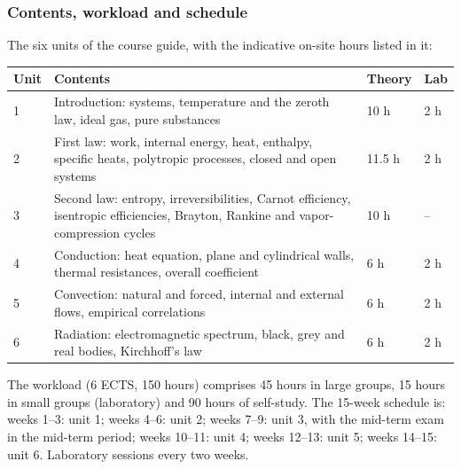 \documentclass[11pt]{article}
\newcommand{\NEW}[1]{\iffinal #1\else{\color{red}#1}\fi}
\begin{document}
\subsubsection{Contents, workload and schedule}
The six units of the course guide, with \NEW{the indicative} on-site hours \NEW{listed in it}:
\begin{center}\small
\begin{tabularx}{\textwidth}{@{}p{0.6cm}Xp{1.3cm}p{1.2cm}@{}}
\toprule
\textbf{Unit} & \textbf{Contents} & \textbf{Theory} & \textbf{Lab} \\
\midrule
1 & Introduction: systems, temperature and the zeroth law, ideal gas, pure substances & 10 h & 2 h \\
2 & First law: work, internal energy, heat, enthalpy, specific heats, polytropic processes, closed and open systems & 11.5 h & 2 h \\
3 & Second law: entropy, irreversibilities, Carnot efficiency, isentropic efficiencies, Brayton, Rankine and vapor-compression cycles & 10 h & -- \\
4 & Conduction: heat equation, plane and cylindrical walls, thermal resistances, overall coefficient & 6 h & 2 h \\
5 & Convection: natural and forced, internal and external flows, empirical correlations & 6 h & 2 h \\
6 & Radiation: electromagnetic spectrum, black, grey and real bodies, Kirchhoff's law & 6 h & 2 h \\
\bottomrule
\end{tabularx}
\end{center}
The workload (6 ECTS, 150 hours) comprises 45 hours in large groups, 15 hours in small
groups (laboratory) and 90 hours of self-study. The 15-week schedule is: weeks 1--3: unit 1; weeks 4--6: unit 2; weeks 7--9:
unit 3, with the mid-term exam in the mid-term period; weeks 10--11: unit 4; weeks
12--13: unit 5; weeks 14--15: unit 6. Laboratory sessions every two weeks.
\end{document}

